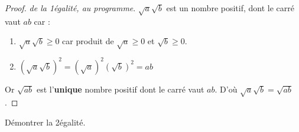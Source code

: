 \begin{proof} \emph{de la 1\iere égalité, au programme}.
	$\sqrt{a}\sqrt{b}$ est un nombre positif, dont le carré vaut $ab$ car : 
	\begin{enumerate}[label=\textbullet]
		\item $\sqrt{a}\sqrt{b}\geqslant 0$ car produit de $\sqrt{a}\geqslant 0$ et $\sqrt{b}\geqslant 0$.
		\item  $(\sqrt{a}\sqrt{b})^2=(\sqrt{a})^2(\sqrt{b})^2 = ab$
	\end{enumerate} 
	Or $\sqrt{ab}$ est l'\textbf{unique} nombre positif dont le carré vaut $ab$.
	D'où $\sqrt{a}\sqrt{b} = \sqrt{ab}$. 
\end{proof}
\begin{exerciseT}[À vous] Démontrer la 2\ieme égalité.
\end{exerciseT}

